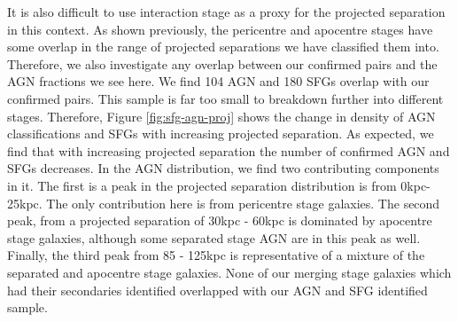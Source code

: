 It is also difficult to use interaction stage as a proxy for the projected separation in this context. As shown previously, the pericentre and apocentre stages have some overlap in the range of projected separations we have classified them into. Therefore, we also investigate any overlap between our confirmed pairs and the AGN fractions we see here. We find 104 AGN and 180 SFGs overlap with our confirmed pairs. This sample is far too small to breakdown further into different stages. Therefore, Figure \ref{fig:sfg-agn-proj} shows the change in density of AGN classifications and SFGs with increasing projected separation. As expected, we find that with increasing projected separation the number of confirmed AGN and SFGs decreases. In the AGN distribution, we find two contributing components in it. The first is a peak in the projected separation distribution is from 0kpc-25kpc. The only contribution here is from pericentre stage galaxies. The second peak, from a projected separation of 30kpc - 60kpc is dominated by apocentre stage galaxies, although some separated stage AGN are in this peak as well. Finally, the third peak from 85 - 125kpc is representative of a mixture of the separated and apocentre stage galaxies. None of our merging stage galaxies which had their secondaries identified overlapped with our AGN and SFG identified sample.

